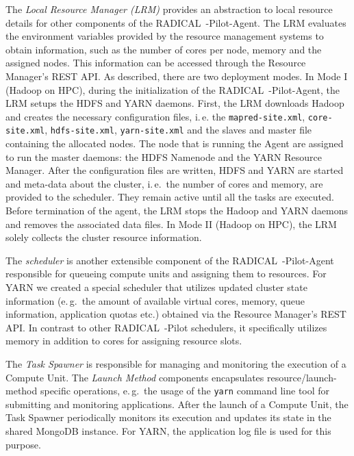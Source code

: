 The \emph{Local Resource Manager (LRM)} provides an abstraction to local resource details for other components of the RADICAL~-Pilot-Agent.
The LRM evaluates the environment variables provided by the resource management systems to obtain information, such as the number of cores per node, memory and the assigned nodes.
This information can be accessed through the Resource Manager's REST API.
As described, there are two deployment modes.
In Mode I (Hadoop on HPC), during the initialization of the RADICAL~-Pilot-Agent, the LRM setups the HDFS and YARN daemons.
First, the LRM downloads Hadoop and creates the necessary configuration files, i.\,e. the \texttt{mapred-site.xml}, \texttt{core-site.xml}, \texttt{hdfs-site.xml}, \texttt{yarn-site.xml} and the slaves and master file containing the allocated nodes.
The node that is running the Agent are assigned to run the master daemons: the HDFS Namenode and the YARN Resource Manager.
After the configuration files are written, HDFS and YARN are started and meta-data about the cluster, i.\,e.\ the number of cores and memory, are provided to the scheduler.
They remain active until all the tasks are executed.
Before termination of the agent, the LRM stops the Hadoop and YARN daemons and removes the associated data files.
In Mode II (Hadoop on HPC), the LRM solely collects the cluster resource information.

The \emph{scheduler} is another extensible component of the RADICAL~-Pilot-Agent responsible for queueing compute units and assigning them to resources.
For YARN we created a special scheduler that utilizes updated cluster state information (e.\,g.\ the amount of available virtual cores, memory, queue information, application quotas etc.) obtained via the Resource Manager's REST API.
In contrast to other RADICAL~-Pilot schedulers, it specifically utilizes memory in addition to cores for assigning resource slots.

The \emph{Task Spawner} is responsible for managing and monitoring the execution of a Compute Unit.
The \emph{Launch Method} components encapsulates resource/launch-method specific operations, e.\,g.\ the usage of the \texttt{yarn} command line tool for submitting and monitoring applications.
After the launch of a Compute Unit, the Task Spawner periodically monitors its execution and updates its state in the shared MongoDB instance.
For YARN, the application log file is used for this purpose.

